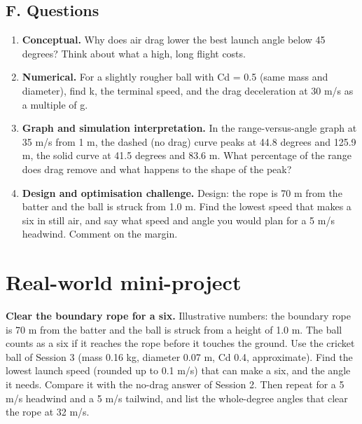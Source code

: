 \documentclass[11pt,a4paper]{article}
\begin{document}
\subsection*{F. Questions}
\begin{enumerate}[nosep]
\item \textbf{Conceptual.} Why does air drag lower the best launch angle below 45 degrees? Think about what a high, long flight costs.
\item \textbf{Numerical.} For a slightly rougher ball with Cd = 0.5 (same mass and diameter), find k, the terminal speed, and the drag deceleration at 30 m/s as a multiple of g.
\item \textbf{Graph and simulation interpretation.} In the range-versus-angle graph at 35 m/s from 1 m, the dashed (no drag) curve peaks at 44.8 degrees and 125.9 m, the solid curve at 41.5 degrees and 83.6 m. What percentage of the range does drag remove and what happens to the shape of the peak?
\item \textbf{Design and optimisation challenge.} Design: the rope is 70 m from the batter and the ball is struck from 1.0 m. Find the lowest speed that makes a six in still air, and say what speed and angle you would plan for a 5 m/s headwind. Comment on the margin.
\end{enumerate}

\section{Real-world mini-project}
\textbf{Clear the boundary rope for a six.} Illustrative numbers: the boundary rope is 70 m from the batter and the ball is struck from a height of 1.0 m. The ball counts as a six if it reaches the rope before it touches the ground. Use the cricket ball of Session 3 (mass 0.16 kg, diameter 0.07 m, Cd 0.4, approximate). Find the lowest launch speed (rounded up to 0.1 m/s) that can make a six, and the angle it needs. Compare it with the no-drag answer of Session 2. Then repeat for a 5 m/s headwind and a 5 m/s tailwind, and list the whole-degree angles that clear the rope at 32 m/s.
\end{document}
